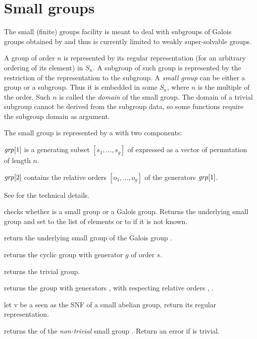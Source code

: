 \section{Small groups}

The small (finite) groups facility is meant to deal with subgroups of Galois
groups obtained by  and thus is currently limited to weakly
super-solvable groups.

A group  of order $n$ is represented by its regular representation
(for an arbitrary ordering of its element) in $S_n$.  A subgroup of such group
is represented by the restriction of the representation to the subgroup.
A \emph{small group} can be either a group or a subgroup. Thus it is embedded
in some $S_n$, where $n$ is the multiple of the order. Such $n$ is called the
\emph{domain} of the small group. The domain of a trivial subgroup cannot be
derived from the subgroup data, so some functions require the subgroup domain
as argument.

The small group  is represented by a  with two
components:

$\hbox{\it grp\/}[1]$ is a generating subset $[s_1,\ldots,s_g]$ of 
expressed as a vector of permutation of length $n$.

$\hbox{\it grp\/}[2]$ contains the relative orders $[o_1,\ldots,o_g]$ of
the generators $\hbox{\it grp\/}[1]$.

See  for the technical details.

 checks whether  is a
small group or a Galois group. Returns the underlying small
group and set  to the list of elements or to  if it is not
known.

 return the underlying small group of the
Galois group .

 returns the cyclic group with generator
$g$ of order $s$.

 returns the trivial group.

 returns the group
with generators ,  with respecting relative orders ,
.

 let v be a  seen as the SNF of
a small abelian group, return its regular representation.

 returns the  of the
\emph{non-trivial} small group . Return an error if  is
trivial.

